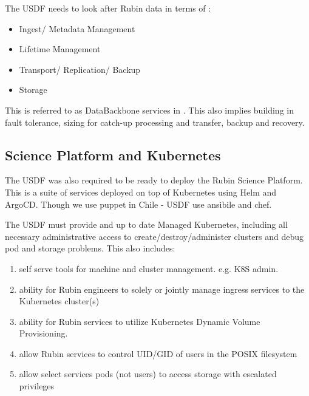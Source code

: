 The USDF needs to look after Rubin data in terms of :
\begin{itemize}
	\item Ingest/ Metadata Management
	\item Lifetime Management
	\item Transport/ Replication/ Backup
	\item Storage
\end{itemize}

This is referred to as DataBackbone services  in \cite{DMTN-104}.
This also implies building in fault tolerance, sizing for catch-up processing and transfer, backup and recovery.

\subsection{Science Platform and Kubernetes} \label{sec:rsp}
The USDF was also required to be ready to deploy the Rubin Science Platform.
This is a suite of services deployed on top  of Kubernetes using Helm and ArgoCD.
Though we use puppet in Chile - USDF use ansibile and chef.

The USDF must provide and up to date Managed Kubernetes, including all necessary administrative access to create/destroy/administer clusters and debug pod and storage problems. This also includes:

\begin{enumerate}
\item self serve tools for machine and cluster management. e.g. K8S admin.
\item  ability for Rubin engineers to solely or jointly manage ingress services to the Kubernetes cluster(s)
\item ability for Rubin services to utilize Kubernetes Dynamic Volume Provisioning.
\item allow Rubin services to control UID/GID of users in the POSIX filesystem
\item  allow select services pods (not users) to access storage with escalated privileges
\end{enumerate}

